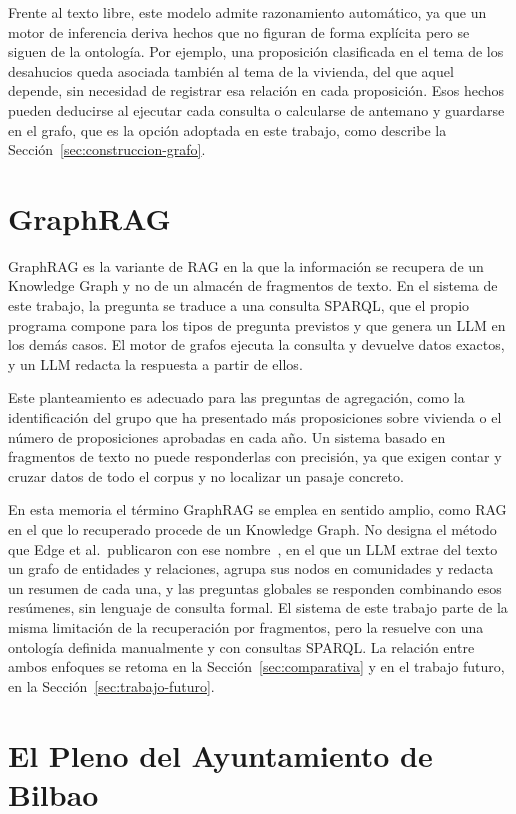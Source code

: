 \documentclass[11pt, a4paper]{report}
\begin{document}
	Frente al texto libre, este modelo admite razonamiento automático, ya que un motor de inferencia deriva hechos que no figuran de forma explícita pero se siguen de
	la ontología. Por ejemplo, una proposición clasificada en el tema de los
	desahucios queda asociada también al tema de la vivienda, del que aquel
	depende, sin necesidad de registrar esa relación en cada proposición. Esos
	hechos pueden deducirse al ejecutar cada consulta o calcularse de antemano y
	guardarse en el grafo, que es la opción adoptada en este trabajo, como
	describe la Sección~\ref{sec:construccion-grafo}.

	\section{GraphRAG}
	\label{sec:graphrag}

	GraphRAG es la variante de RAG en la que la información se recupera de un
	Knowledge Graph y no de un almacén de fragmentos de texto. En el sistema
	de este trabajo, la pregunta se traduce a una consulta SPARQL, que el propio
	programa compone para los tipos de pregunta previstos y que genera un LLM en
	los demás casos. El motor de grafos ejecuta la consulta y devuelve datos
	exactos, y un LLM redacta la respuesta a partir de ellos.

	Este planteamiento es adecuado para las preguntas de agregación, como la
	identificación del grupo que ha presentado más proposiciones sobre vivienda o
	el número de proposiciones aprobadas en cada año. Un sistema basado en
	fragmentos de texto no puede responderlas con precisión, ya que exigen contar
	y cruzar datos de todo el corpus y no localizar un pasaje concreto.

	En esta memoria el término GraphRAG se emplea en sentido amplio, como RAG en
	el que lo recuperado procede de un Knowledge Graph. No designa el método que Edge et al.\ publicaron con
	ese nombre~\cite{edge2024-graphrag}, en el que un LLM extrae del texto un
	grafo de entidades y relaciones, agrupa sus nodos en comunidades y redacta un
	resumen de cada una, y las preguntas globales se responden combinando esos
	resúmenes, sin lenguaje de consulta formal. El sistema de este trabajo parte
	de la misma limitación de la recuperación por fragmentos, pero la resuelve con
	una ontología definida manualmente y con consultas SPARQL. La relación entre
	ambos enfoques se retoma en la Sección~\ref{sec:comparativa} y en el trabajo
	futuro, en la Sección~\ref{sec:trabajo-futuro}.

	\section{El Pleno del Ayuntamiento de Bilbao}
\end{document}
